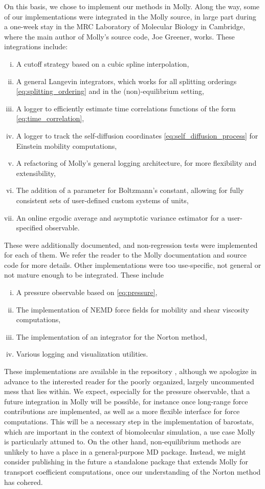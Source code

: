 On this basis, we chose to implement our methods in Molly. Along the way, some of our implementations were integrated in the Molly source, in large part during a one-week stay in the MRC Laboratory of Molecular Biology in Cambridge, where the main author of Molly's source code, Joe Greener, works.
These integrations include:
\begin{enumerate}[i)]
    \item A cutoff strategy based on a cubic spline interpolation,
    \item A general Langevin integrators, which works for all splitting orderings \eqref{eq:splitting_ordering} and in the (non)-equilibrium setting,
    \item A logger to efficiently estimate time correlations functions of the form \eqref{eq:time_correlation},
    \item A logger to track the self-diffusion coordinates \eqref{eq:self_diffusion_process} for Einstein mobility computations,
    \item A refactoring of Molly's general logging architecture, for more flexibility and extensibility,
    \item The addition of a parameter for Boltzmann's constant, allowing for fully consistent sets of user-defined custom systems of units,
    \item An online ergodic average and asymptotic variance estimator for a user-specified observable.
\end{enumerate}
These were additionally documented, and non-regression tests were implemented for each of them. We refer the reader to the Molly documentation and source code for more details.
Other implementations were too use-specific, not general or not mature enough to be integrated. These include
\begin{enumerate}[i)]
    \item A pressure observable based on \eqref{eq:pressure},
    \item The implementation of NEMD force fields for mobility and shear viscosity computations,
    \item The implementation of an integrator for the Norton method,
    \item Various logging and visualization utilities.
\end{enumerate}
These implementations are available in the repository \cite{myrepo}, although we apologize in advance to the interested reader for the poorly organized, largely uncommented mess that lies within.
We expect, especially for the pressure observable, that a future integration in Molly will be possible, for instance once long-range force contributions are implemented, as well as a more flexible interface for force computations.
This will be a necessary step in the implementation of barostats, which are important in the context of biomolecular simulation, a use case Molly is particularly attuned to.
On the other hand, non-equilibrium methods are unlikely to have a place in a general-purpose MD package.
Instead, we might consider publishing in the future a standalone package that extends Molly for transport coefficient computations, once our understanding of the Norton method has cohered.
